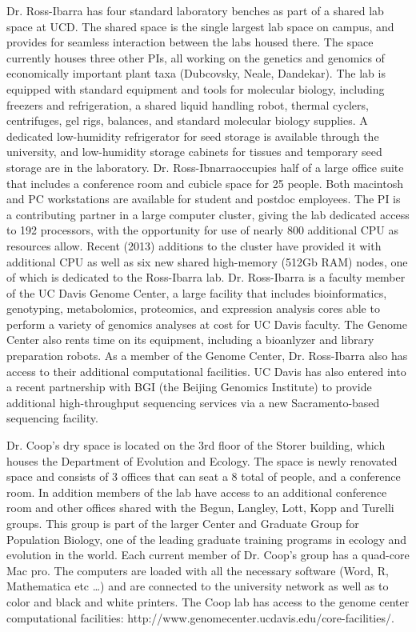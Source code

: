 Dr. Ross-Ibarra has four standard laboratory benches as part of a shared lab space at UCD.  The shared space is the single largest lab space on campus, and provides for seamless interaction between the labs housed there.  The space currently houses three other PIs, all working on the genetics and genomics of economically important plant taxa (Dubcovsky, Neale, Dandekar). The lab is equipped with standard equipment and tools for molecular biology, including freezers and refrigeration, a shared liquid handling robot, thermal cyclers, centrifuges, gel rigs, balances, and standard molecular biology supplies.  A dedicated low-humidity refrigerator for seed storage is available through the university, and low-humidity storage cabinets for tissues and temporary seed storage are in the laboratory. Dr. Ross-Ibnarraoccupies half of a large office suite that includes a conference room and cubicle space for 25 people.  Both macintosh and PC workstations are available for student and postdoc employees. The PI is a contributing partner in a large computer cluster, giving the lab dedicated access to 192 processors, with the opportunity for use of nearly 800 additional CPU as resources allow. Recent (2013) additions to the cluster have provided it with additional CPU as well as six new shared high-memory (512Gb RAM) nodes, one of which is dedicated to the Ross-Ibarra lab. Dr. Ross-Ibarra is a faculty member of the UC Davis Genome Center, a large facility that includes bioinformatics, genotyping, metabolomics, proteomics, and expression analysis cores able to perform a variety of genomics analyses at cost for UC Davis faculty. The Genome Center also rents time on its equipment, including a bioanlyzer and library preparation robots. As a member of the Genome Center, Dr. Ross-Ibarra also has access to their additional computational facilities. UC Davis has also entered into a recent partnership with BGI (the Beijing Genomics Institute) to provide additional high-throughput sequencing services via a new Sacramento-based sequencing facility.

Dr. Coop’s dry space is located on the 3rd floor of the Storer building, which houses the Department of Evolution and Ecology. The space is newly renovated space and consists of 3 offices that can seat a 8 total of people, and a conference room. In addition members of the lab have access to an additional conference room and other offices shared with the Begun, Langley, Lott, Kopp and Turelli groups. This group is part of the larger Center and Graduate Group for Population Biology, one of the leading graduate training programs in ecology and evolution in the world. Each current member of Dr. Coop’s group has a quad-core Mac pro. The computers are loaded with all the necessary software (Word, R, Mathematica etc …) and are connected to the university network as well as to color and black and white printers. The Coop lab has access to the genome center computational facilities: http://www.genomecenter.ucdavis.edu/core-facilities/. 

